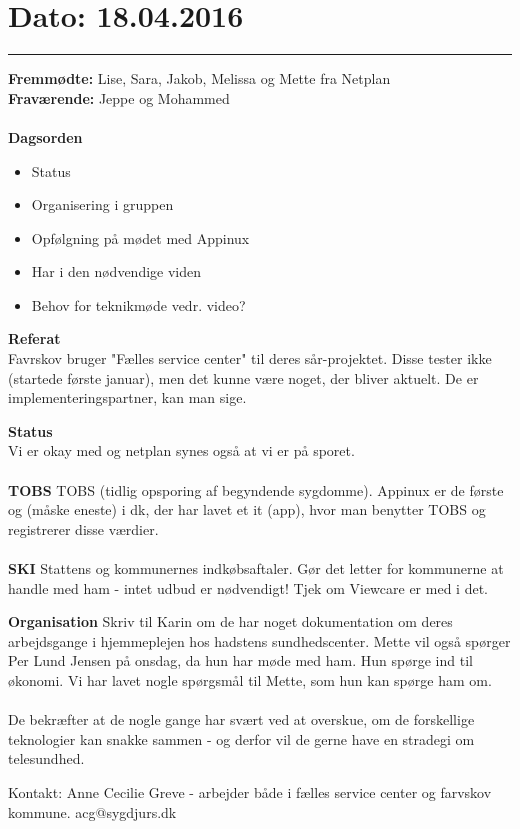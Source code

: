 

\section{Dato: 18.04.2016}
\hrule

\textbf{Fremmødte:} Lise, Sara, Jakob, Melissa og Mette fra Netplan \\
\textbf{Fraværende:} Jeppe og Mohammed 
\\
\\
\textbf{Dagsorden}
\begin{itemize}
	\item Status 
	\item Organisering i gruppen 
	\item Opfølgning på mødet med Appinux
	\item Har i den nødvendige viden
	\item Behov for teknikmøde vedr. video? 
\end{itemize}

\textbf{Referat} 
\\



Favrskov bruger "Fælles service center" til deres sår-projektet. Disse tester ikke (startede første januar), men det kunne være noget, der bliver aktuelt. De er implementeringspartner, kan man sige.   

\textbf{Status}\\
Vi er okay med og netplan synes også at vi er på sporet. \\ \\
\textbf{TOBS}
TOBS (tidlig opsporing af begyndende sygdomme). Appinux er de første og (måske eneste) i dk, der har lavet et it (app), hvor man benytter TOBS og registrerer disse værdier. \\ \\
\textbf{SKI}
Stattens og kommunernes indkøbsaftaler. Gør det letter for kommunerne at handle med ham - intet udbud er nødvendigt! Tjek om Viewcare er med i det. 


\textbf{Organisation}
Skriv til Karin om de har noget dokumentation om deres arbejdsgange i hjemmeplejen hos hadstens sundhedscenter. Mette vil også spørger Per Lund Jensen på onsdag, da hun har møde med ham. Hun spørge ind til økonomi. Vi har lavet nogle spørgsmål til Mette, som hun kan spørge ham om.  
\\ \\
De bekræfter at de nogle gange har svært ved at overskue, om de forskellige teknologier kan snakke sammen - og derfor vil de gerne have en stradegi om telesundhed.

Kontakt: Anne Cecilie Greve - arbejder både i fælles service center og farvskov kommune. acg@sygdjurs.dk  








